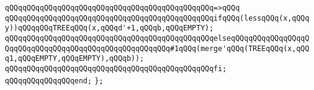 \verb|qQQqqQQqqQQqqQQqqQQqqQQqqQQqqQQqqQQqqQQqqQQqqQQq=>qQQq|\newline
\verb|qQQqqQQqqQQqqQQqqQQqqQQqqQQqqQQqqQQqqQQqqQQqqQQqifqQQq(lessqQQq(x,qQQqy))qQQqqQQqTREEqQQq(x,qQQqd'+1,qQQqb,qQQqEMPTY);|\newline
\verb|qQQqqQQqqQQqqQQqqQQqqQQqqQQqqQQqqQQqqQQqqQQqqQQqelseqQQqqQQqqQQqqQQqqQQqqQQqqQQqqQQqqQQqqQQqqQQqqQQqqQQqqQQq#1qQQq(merge'qQQq(TREEqQQq(x,qQQq1,qQQqEMPTY,qQQqEMPTY),qQQqb));|\newline
\verb|qQQqqQQqqQQqqQQqqQQqqQQqqQQqqQQqqQQqqQQqqQQqqQQqfi;|\newline
\verb|qQQqqQQqqQQqqQQqend;|\newline
\verb|};|\newline
\newline

